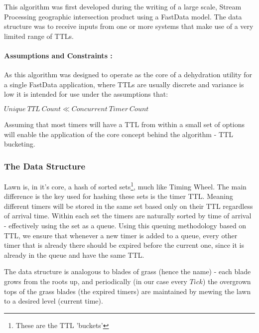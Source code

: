 \documentclass[twocolumn,a4paper]{article}
\begin{document}
This algorithm was first developed during the writing of a large scale, Stream Processing geographic intersection product using a FastData\cite{GP} model. The data structure was to receive inputs from one or more systems that make use of a very limited range of TTLs. 

\paragraph{Assumptions and Constraints :}
As this algorithm was designed to operate as the core of a dehydration utility for a single  FastData application, where TTLs are usually discrete and variance is low it is intended for use under the assumptions that: 
\begin{center}
	$ Unique\ TTL\ Count \ll Concurrent\ Timer\ Count $
\end{center}
Assuming that most timers will have a TTL from within a small set of options will enable the application of the core concept behind the algorithm - TTL bucketing. 

\subsubsection{The Data Structure}
Lawn is, in it's core, a hash of sorted sets\footnote{These are the TTL 'buckets'}, much like Timing Wheel. The main difference is the key used for hashing these sets is the timer TTL. Meaning different timers will be stored in the same set based only on their TTL regardless of arrival time. Within each set the timers are naturally sorted by time  of arrival - effectively using the set as a queue. Using this queuing methodology based on TTL, we ensure that whenever a new timer is added to a queue, every other timer that is already there should be expired before the current one, since it is already in the queue and have the same TTL.

The data structure is analogous to blades of grass (hence the name) - each blade grows from the roots up, and periodically (in our case every $Tick$) the overgrown tops of the grass blades (the expired timers) are maintained by mewing the lawn to a desired level (current time).       
 
\end{document}
